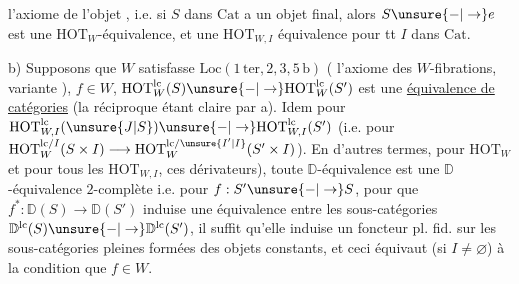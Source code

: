 
l'axiome de l'objet , i.e.  si
$S$ dans $\mathrm{Cat}$ a un objet final, alors $S\unsure{-|\to}e$
est une $\mathrm{HOT}_{W}$-équivalence, et  une
$\mathrm{HOT}_{W,I}$ équivalence pour tt $I$ dans $\mathrm{Cat}$.

b) Supposons que $W$ satisfasse
$\mathrm{Loc}(1\,\mathrm{ter},2,3,5\,\mathrm{b})$ ( l'axiome  des $W$-fibrations, variante ),  
$f\in W$, $\mathrm{HOT}_{W}^{\mathrm{lc}}(S)\unsure{-|\to}\mathrm{HOT}_{W}^{\mathrm{lc}}(S')$ est une
\uline{équivalence de catégories} (la réciproque
étant claire par a). Idem pour
$\mathrm{HOT}_{W,I}^{\mathrm{lc}}(\unsure{J|S})\unsure{-|\to}\mathrm{HOT}_{W,I}^{\mathrm{lc}}(S')$ (i.e. pour
$\mathrm{HOT}_{W}^{\mathrm{lc}/I}(S\times I)\longrightarrow\mathrm{HOT}_{W}^{\mathrm{lc}/\unsure{I'|I}}(S'\times I)$). En
d'autres termes, pour  $\mathrm{HOT}_{W}$ et
pour tous les $\mathrm{HOT}_{W,I}$, 
ces dérivateurs), toute $\mathbb D$-équivalence
est une $\mathbb D$-équivalence $2$-complète
i.e. pour $f:S'\unsure{-|\to}S$, pour que $f^*:\mathbb D(S)\to\mathbb D(S')$
induise une  équivalence entre les
sous-catégories $\mathbb D^{\mathrm{lc}}(S)\unsure{-|\to}\mathbb D^{\mathrm{lc}}(S')$, il suffit 
qu'elle induise un foncteur pl. fid.
sur les sous-catégories pleines formées des
objets constants, et ceci équivaut (si $I\ne\varnothing$)
à la condition que $f\in W$.
